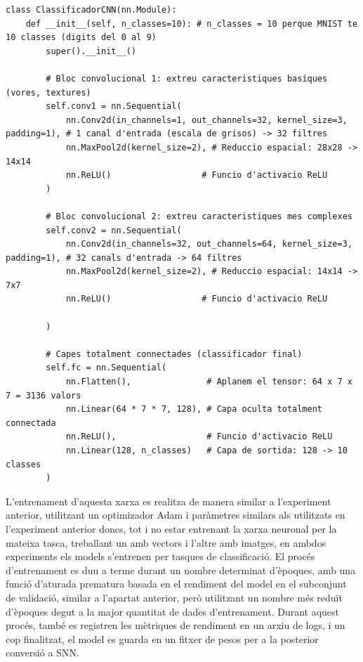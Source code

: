 \documentclass[a4paper,11pt, titlepage, twoside]{article}
\begin{document}
\vspace{3mm}
\begin{lstlisting}[style=codi, caption={Arquitectura del model ClassificadorCNN}, captionpos=b, label={lst:ClassificadorCNN}, firstnumber=12]
class ClassificadorCNN(nn.Module):
    def __init__(self, n_classes=10): # n_classes = 10 perque MNIST te 10 classes (digits del 0 al 9)
        super().__init__()

        # Bloc convolucional 1: extreu caracteristiques basiques (vores, textures)
        self.conv1 = nn.Sequential(
            nn.Conv2d(in_channels=1, out_channels=32, kernel_size=3, padding=1), # 1 canal d'entrada (escala de grisos) -> 32 filtres
            nn.MaxPool2d(kernel_size=2), # Reduccio espacial: 28x28 -> 14x14
            nn.ReLU()                  # Funcio d'activacio ReLU
        )

        # Bloc convolucional 2: extreu caracteristiques mes complexes
        self.conv2 = nn.Sequential(
            nn.Conv2d(in_channels=32, out_channels=64, kernel_size=3, padding=1), # 32 canals d'entrada -> 64 filtres
            nn.MaxPool2d(kernel_size=2), # Reduccio espacial: 14x14 -> 7x7
            nn.ReLU()                  # Funcio d'activacio ReLU

        )

        # Capes totalment connectades (classificador final)
        self.fc = nn.Sequential(
            nn.Flatten(),               # Aplanem el tensor: 64 x 7 x 7 = 3136 valors
            nn.Linear(64 * 7 * 7, 128), # Capa oculta totalment connectada
            nn.ReLU(),                  # Funcio d'activacio ReLU
            nn.Linear(128, n_classes)   # Capa de sortida: 128 -> 10 classes
        )
\end{lstlisting}

L'entrenament d'aquesta xarxa es realitza de manera similar a l'experiment anterior, utilitzant un optimizador Adam i paràmetres similars als utilitzats en l'experiment anterior doncs, tot i no estar entrenant la xarxa neuronal per la mateixa tasca, treballant un amb vectors i l'altre amb imatges, en ambdos experiments els models s'entrenen per tasques de classificació. El procés d'entrenament es duu a terme durant un nombre determinat d'èpoques, amb una funció d'aturada prematura basada en el rendiment del model en el subconjunt de validació, similar a l'apartat anterior, però utilitzant un nombre més reduït d'èpoques degut a la major quantitat de dades d'entrenament. Durant aquest procés, també es registren les mètriques de rendiment en un arxiu de logs, i un cop finalitzat, el model es guarda en un fitxer de pesos per a la posterior conversió a SNN.
\end{document}
